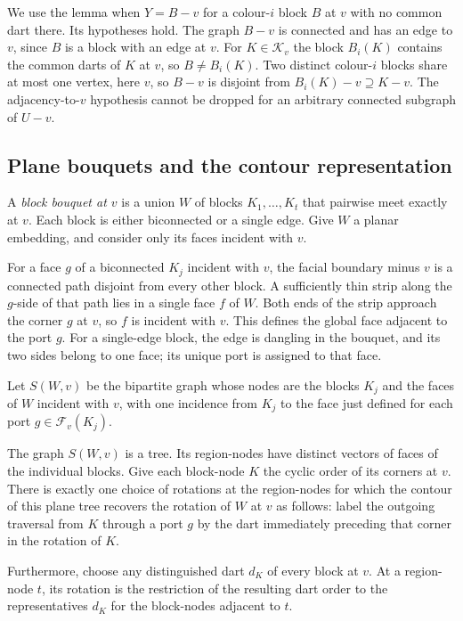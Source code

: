 We use the lemma when $Y=B-v$ for a colour-$i$ block $B$ at $v$ with no
common dart there.  Its hypotheses hold.  The graph $B-v$ is connected
and has an edge to $v$, since $B$ is a block with an edge at $v$.  For
$K\in\mathcal K_v$ the block $B_i(K)$ contains the common darts of $K$ at
$v$, so $B\ne B_i(K)$.  Two distinct colour-$i$ blocks share at most one
vertex, here $v$, so $B-v$ is disjoint from $B_i(K)-v\supseteq K-v$.  The
adjacency-to-$v$ hypothesis cannot be dropped for an arbitrary connected
subgraph of $U-v$.

\subsection{Plane bouquets and the contour representation}
\label{rep:bouquets}

A \emph{block bouquet at $v$} is a union $W$ of blocks
$K_1,\ldots,K_t$ that pairwise meet exactly at $v$.  Each block is either
biconnected or a single edge.  Give $W$ a planar embedding, and consider only
its faces incident with $v$.

For a face $g$ of a biconnected $K_j$ incident with $v$, the facial boundary
minus $v$ is a connected path disjoint from every other block.  A sufficiently
thin strip along the $g$-side of that path lies in a single face $f$ of $W$.
Both ends of the strip approach the corner $g$ at $v$, so $f$ is incident
with $v$.  This defines the global face adjacent to the port $g$.  For a
single-edge block, the edge is dangling in the bouquet, and its two sides
belong to one face; its unique port is assigned to that face.

Let $S(W,v)$ be the bipartite graph whose nodes are the blocks $K_j$ and the
faces of $W$ incident with $v$, with one incidence from $K_j$ to the face just
defined for each port $g\in\mathcal F_v(K_j)$.

\begin{lemma}
\label{rep:lem:bouquet}
The graph $S(W,v)$ is a tree.  Its region-nodes have distinct vectors of faces
of the individual blocks.  Give each block-node $K$ the cyclic order of its
corners at $v$.  There is exactly one choice of rotations at the region-nodes
for which the contour of this plane tree recovers the rotation of $W$ at $v$
as follows: label the outgoing traversal from $K$ through a port $g$ by the
dart immediately preceding that corner in the rotation of $K$.

Furthermore, choose any distinguished dart $d_K$ of every block at $v$.
At a region-node $t$, its rotation is the restriction of the resulting dart
order to the representatives $d_K$ for the block-nodes adjacent to $t$.
\end{lemma}

